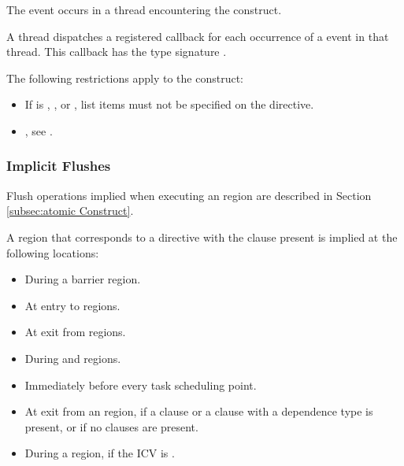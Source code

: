 \events

The  event occurs in a thread encountering the
 construct.

\tools

A thread dispatches a registered  callback
for each occurrence of a  event in that thread. This
callback has the type signature .

\restrictions

The following restrictions apply to the  construct:

\begin{itemize}
\item If  is , , or
    , list items must not be specified on the  directive.
\end{itemize}

\crossreferences
\begin{itemize}
\item {}, see
.
\end{itemize}

\subsubsection{Implicit Flushes}
\label{subsec:implicit flushes}

Flush operations implied when executing an  region are described in
Section \ref{subsec:atomic Construct}.

A  region that corresponds to a  directive with the
 clause present is implied at the following locations:

\begin{itemize}
\item During a barrier region.
\item At entry to  regions.
\item At exit from  regions.
\item During  and 
    regions.
\item Immediately before every task scheduling point.
\item At exit from an  region, if a
     clause or a  clause with a
     dependence type is present, or if no clauses are present.
\item During a  region, if the  ICV is
    .
\end{itemize}

